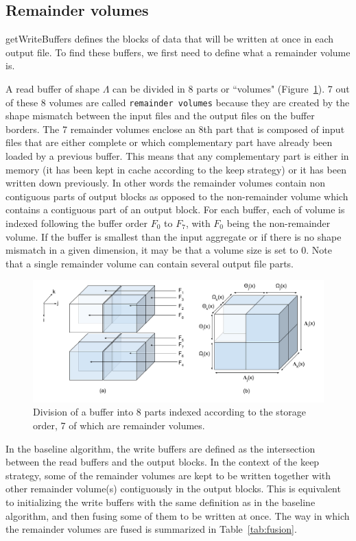 \documentclass[conference]{IEEEtran}
\begin{document}
\subsection{Remainder volumes}

getWriteBuffers defines the blocks of data that will be written at once in each
output file.
To find these buffers, we first need to define what a remainder volume is.

A read buffer of shape $\Lambda$ can be divided in
8 parts or ``volumes" (Figure~\ref{fig:nomenclature_overlaps}).
7 out of these 8 volumes are called \texttt{remainder volumes} because
they are created by the shape mismatch between the input files and the output files on
the buffer borders.
The 7 remainder volumes enclose an 8th part that is composed of
input files that are either complete or which complementary part have already
been loaded by a previous buffer. This means that any complementary part is either
in memory (it has been kept in cache according to the keep strategy) or it has
been written down previously.
In other words the remainder volumes contain non contiguous parts of output blocks
as opposed to the non-remainder volume which contains a contiguous part of
an output block.
For each buffer, each of volume
is indexed following the buffer order $F_0$ to $F_7$, with $F_0$ being the
non-remainder volume. If the buffer is smallest than the input aggregate or if
there is no shape mismatch in a given dimension, it may be that a volume size
is set to 0.
Note that a single remainder volume can contain several output file parts.

\begin{figure}[h]
\centering
\includegraphics[scale=0.4]{./figures/new/nomenclature_overlaps.png}
\caption{Division of a buffer into 8 parts indexed according to the storage
order, 7 of which are remainder volumes.}
\label{fig:nomenclature_overlaps}
\end{figure}

In the baseline algorithm, the write buffers are defined as the
intersection between the read buffers and the output blocks.
In the context of the keep strategy, some of the remainder volumes are kept
to be written together with other remainder volume(s) contiguously in the output
blocks.
This is equivalent to initializing the write buffers with the same definition as
in the baseline algorithm, and then fusing some of them to be written at once.
The way in which the remainder volumes are fused is summarized in
Table~\ref{tab:fusion}.
\end{document}
